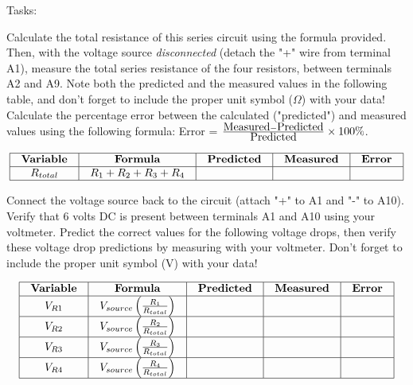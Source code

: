 \vskip 10pt

\goodbreak

\noindent Tasks:

Calculate the total resistance of this series circuit using the formula provided.  Then, with the voltage source {\it disconnected} (detach the "+" wire from terminal A1), measure the total series resistance of the four resistors, between terminals A2 and A9.  Note both the predicted and the measured values in the following table, and don't forget to include the proper unit symbol ($\Omega$) with your data!   Calculate the percentage error between the calculated ("predicted") and measured values using the following formula: Error = ${\hbox{Measured} - \hbox{Predicted} \over \hbox{Predicted}} \times 100 \%$.

$$\vbox{\offinterlineskip
\halign{\strut
\vrule \quad\hfil # \ \hfil & 
\vrule \quad\hfil # \ \hfil & 
\vrule \quad\hfil # \ \hfil & 
\vrule \quad\hfil # \ \hfil & 
\vrule \quad\hfil # \ \hfil \vrule \cr 
\noalign{\hrule}
%
{\bf Variable} & {\bf Formula} & {\bf Predicted} & {\bf Measured} & {\bf Error} \cr
\noalign{\hrule}
%
$R_{total}$  &  $R_1 + R_2 + R_3 + R_4$  &   &   &   \cr
\noalign{\hrule}
} %
}$$ %

Connect the voltage source back to the circuit (attach "+" to A1 and "-" to A10).  Verify that 6 volts DC is present between terminals A1 and A10 using your voltmeter.  Predict the correct values for the following voltage drops, then verify these voltage drop predictions by measuring with your voltmeter.  Don't forget to include the proper unit symbol (V) with your data!


$$\vbox{\offinterlineskip
\halign{\strut
\vrule \quad\hfil # \ \hfil & 
\vrule \quad\hfil # \ \hfil & 
\vrule \quad\hfil # \ \hfil & 
\vrule \quad\hfil # \ \hfil & 
\vrule \quad\hfil # \ \hfil \vrule \cr 
\noalign{\hrule}
%
{\bf Variable} & {\bf Formula} & {\bf Predicted} & {\bf Measured} & {\bf Error} \cr
\noalign{\hrule}
%
$V_{R1}$  &  $V_{source}\left( R_1 \over R_{total}\right)$  &   &   &   \cr
\noalign{\hrule}
%
$V_{R2}$  &  $V_{source}\left( R_2 \over R_{total}\right)$  &   &   &   \cr
\noalign{\hrule}
%
$V_{R3}$  &  $V_{source}\left( R_3 \over R_{total}\right)$  &   &   &   \cr
\noalign{\hrule}
%
$V_{R4}$  &  $V_{source}\left( R_4 \over R_{total}\right)$  &   &   &   \cr
\noalign{\hrule}
} %
}$$ %

